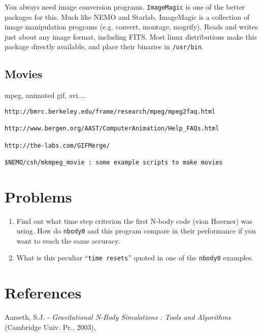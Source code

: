 You always need image conversion programs. {\tt ImageMagic} is one of 
the better packages for this. Much like NEMO and Starlab, ImageMagic
is a collection of image manipulation programs (e.g. convert, montage, mogrify).
Reads and writes just about any image format, including FITS. Most linux
distributions make this package directly available, and place their
binaries in {\tt /usr/bin}.

\section{Movies}

mpeg, animated gif, avi....

\begin{verbatim}
http://bmrc.berkeley.edu/frame/research/mpeg/mpeg2faq.html

http://www.bergen.org/AAST/ComputerAnimation/Help_FAQs.html

http://the-labs.com/GIFMerge/

$NEMO/csh/mkmpeg_movie : some example scripts to make movies

\end{verbatim} 
\chapter                {Problems}

\begin{enumerate}

\item 
Find out what time step criterion the first N-body code (vion Hoerner)
was using. How do {\tt nbody0} and this program compare in their performance
if you want to reach the same accuracy.

\item
What is this peculiar ``{\tt time resets}'' quoted in one of the {\tt nbody0}
examples.

\end{enumerate}


\chapter                {References}


Aarseth, S.J. - 
{\it Gravitational N-Body Simulations : Tools and Algorithms} 
(Cambridge Univ. Pr., 2003),


